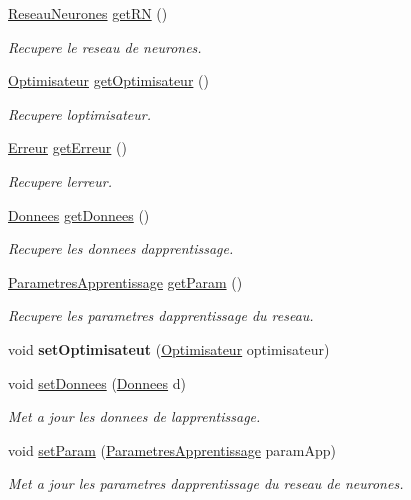 \begin{DoxyCompactItemize}
\hyperlink{class_reseau_neurones}{Reseau\+Neurones} \hyperlink{class_apprentissage_a56d2b6eff05342d1482bfed2a947b60d}{get\+RN} ()
\begin{DoxyCompactList}\small\item\em Recupere le reseau de neurones. \end{DoxyCompactList}\item 
\hyperlink{class_optimisateur}{Optimisateur} \hyperlink{class_apprentissage_af3fdf7d92ebf36d3edb6c4d06addc8e6}{get\+Optimisateur} ()
\begin{DoxyCompactList}\small\item\em Recupere l\textquotesingle{}optimisateur. \end{DoxyCompactList}\item 
\hyperlink{class_erreur}{Erreur} \hyperlink{class_apprentissage_a9df18f6e95729c7263a2ab1fa9a0df8f}{get\+Erreur} ()
\begin{DoxyCompactList}\small\item\em Recupere l\textquotesingle{}erreur. \end{DoxyCompactList}\item 
\hyperlink{class_donnees}{Donnees} \hyperlink{class_apprentissage_ac9fbf481a1bc46c15a36129c1eba3796}{get\+Donnees} ()
\begin{DoxyCompactList}\small\item\em Recupere les donnees d\textquotesingle{}apprentissage. \end{DoxyCompactList}\item 
\hyperlink{class_parametres_apprentissage}{Parametres\+Apprentissage} \hyperlink{class_apprentissage_a025d66e8c5edb1c4c6ce9f3d8c983395}{get\+Param} ()
\begin{DoxyCompactList}\small\item\em Recupere les parametres d\textquotesingle{}apprentissage du reseau. \end{DoxyCompactList}\item 
\mbox{\label{class_apprentissage_a03a3f022cc45f90670f744a7a4cfaf4d}} 
void {\bfseries set\+Optimisateut} (\hyperlink{class_optimisateur}{Optimisateur} optimisateur)
\item 
void \hyperlink{class_apprentissage_a2e16d329d73dad8f771ccb9b7fee3931}{set\+Donnees} (\hyperlink{class_donnees}{Donnees} d)
\begin{DoxyCompactList}\small\item\em Met a jour les donnees de l\textquotesingle{}apprentissage. \end{DoxyCompactList}\item 
void \hyperlink{class_apprentissage_a61b1b8bc359935c1de479a72241acb9c}{set\+Param} (\hyperlink{class_parametres_apprentissage}{Parametres\+Apprentissage} param\+App)
\begin{DoxyCompactList}\small\item\em Met a jour les parametres d\textquotesingle{}apprentissage du reseau de neurones. \end{DoxyCompactList}\end{DoxyCompactItemize}


